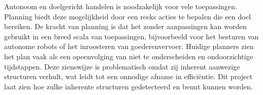Autonoom en doelgericht handelen is noodzakelijk voor vele toepassingen. Planning biedt deze mogelijkheid door een reeks acties te bepalen die een doel bereiken. De kracht van planning is dat het zonder aanpassingen kan worden gebruikt in een breed scala van toepassingen, bijvoorbeeld voor het besturen van autonome robots of het inroosteren van goederenvervoer. Huidige planners zien het plan vaak als een opeenvolging van niet te onderscheiden en ondoorzichtige tijdstappen. Deze zienswijze is problematisch omdat zij inherent aanwezige structuren verhult, wat leidt tot een onnodige afname in efficiëntie. Dit project laat zien hoe zulke inherente structuren gedetecteerd en benut kunnen worden.
